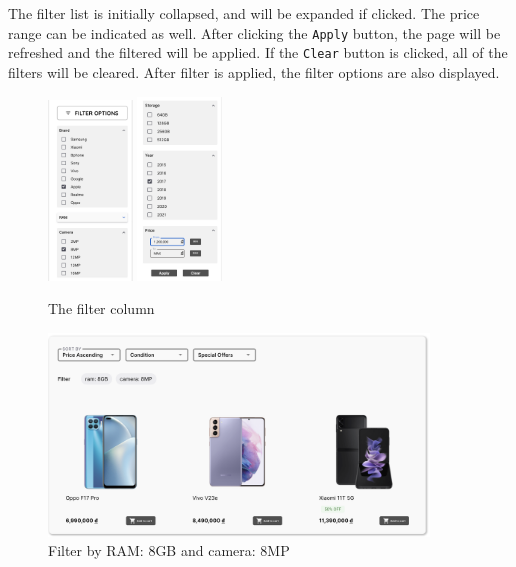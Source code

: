 \documentclass[a4paper]{article}
\numberwithin{equation}{section}
\begin{document}
The filter list is initially collapsed, and will be expanded if clicked.
The price range can be indicated as well.
After clicking the {\tt Apply} button, the page will be refreshed and the filtered will be applied.
If the {\tt Clear} button is clicked, all of the filters will be cleared.
After filter is applied, the filter options are also displayed.

\begin{figure}[H]
  \centering
  \includegraphics[width=0.2\textwidth]{assets/flow/filter1.png}
  \includegraphics[width=0.2\textwidth]{assets/flow/price1.png}
  \caption{The filter column}
\end{figure}

\begin{figure}[H]
  \centering
  \includegraphics[width=0.9\textwidth]{assets/flow/filtered.png}
  \caption{Filter by RAM: 8GB and camera: 8MP}
\end{figure}
\end{document}
